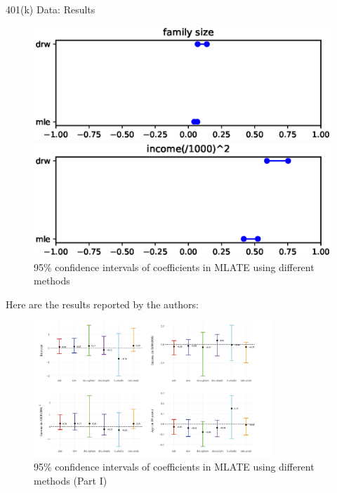 \documentclass[aspectratio=169,xcolor=dvipsnames]{beamer}
\begin{document}
\begin{frame}{401(k) Data: Results}
\begin{figure}
\begin{minipage}{0.4\textwidth}
    \includegraphics[width=\textwidth]{figure/4.eps}
    \end{minipage}
    \begin{minipage}{0.4\textwidth}
    \includegraphics[width=\textwidth]{figure/5.eps}
    \end{minipage}
\caption{95\% confidence intervals of coefficients in MLATE using different methods}
\end{figure}
\end{frame}

\begin{frame}
Here are the results reported by the authors:
\begin{figure}
\includegraphics[width=0.8\textwidth]{figure/401k1.png}
\caption{95\% confidence intervals of coefficients in MLATE using different methods (Part I)}
\end{figure}
\end{frame}
\end{document}
